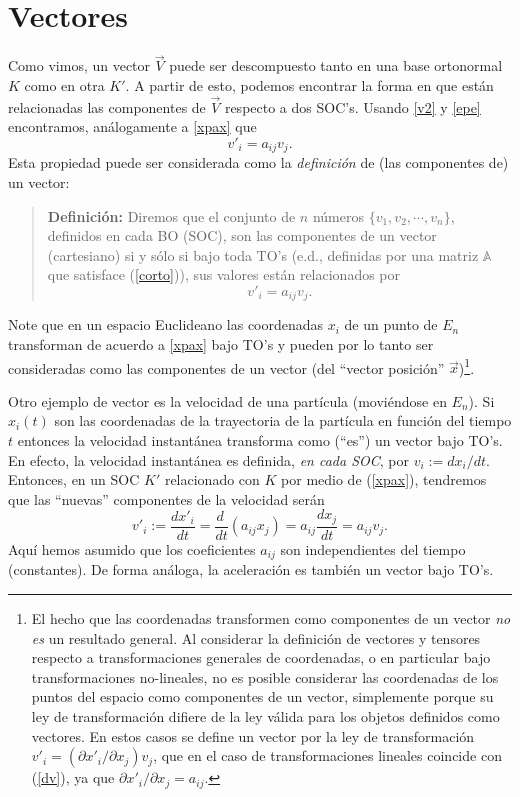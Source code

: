 \section{Vectores}
Como vimos, un vector $\vec{V}$ puede ser descompuesto tanto en una base ortonormal $K$ como en otra $K'$. A partir de esto, podemos encontrar la forma en que están relacionadas las componentes de $\vec{V}$ respecto a dos SOC's. Usando \eqref{v2} y \eqref{epe} encontramos, análogamente a \eqref{xpax} que
\begin{equation}
v'_i=a_{ij}v_j.
\end{equation}
Esta propiedad puede ser considerada como la \textit{definición} de (las componentes de) un vector: 
\begin{quotation}
\textbf{Definición:} Diremos que el conjunto de $n$ números $\lbrace v_1, v_2,\cdots, v_n\rbrace$, definidos en cada BO (SOC), son las componentes de un vector (cartesiano) si y sólo si bajo toda TO's (e.d., definidas por una matriz $\mathbb{A}$ que satisface (\ref{corto})), sus valores están relacionados por 
\begin{equation}\label{dv}
\boxed{v'_i=a_{ij}v_j.}
\end{equation}
\end{quotation}
Note que en un espacio Euclideano las coordenadas $x_i$ de un punto de $E_n$ transforman de acuerdo a \eqref{xpax} bajo TO's y pueden por lo tanto ser consideradas como las componentes de un vector (del ``vector posición'' $\vec{x}$)\footnote{El hecho que las coordenadas transformen como componentes de un vector \textit{no es} un resultado general. Al considerar la definición de vectores y tensores respecto a transformaciones generales de coordenadas, o en particular bajo transformaciones no-lineales, no es posible considerar las coordenadas de los puntos del espacio como componentes de un vector, simplemente porque su ley de transformación difiere de la ley válida para los objetos definidos como vectores. En estos casos se define un vector por la ley de transformación $v'_i=({\partial x'_i}/{\partial x_j})v_j$, que en el caso de transformaciones lineales coincide con (\ref{dv}), ya que ${\partial x'_i}/{\partial x_j}=a_{ij}$.}. 


Otro ejemplo de vector es la velocidad de una partícula (moviéndose en $E_n$). Si $x_i(t)$ son las coordenadas de la trayectoria de la partícula en función del tiempo $t$ entonces la velocidad instantánea transforma como (``es'') un vector bajo TO's. En efecto, la velocidad instantánea es definida, \textit{en cada SOC}, por $v_i:=dx_i/dt$. Entonces, en un SOC $K'$ relacionado con $K$ por medio de (\ref{xpax}), tendremos que las ``nuevas'' componentes de la velocidad serán
\begin{equation}
v'_i:=\frac{dx'_i}{dt}=\frac{d\ }{dt}(a_{ij}x_j)=a_{ij}\frac{dx_j}{dt}=a_{ij}v_j.
\end{equation}
Aquí hemos asumido que los coeficientes $a_{ij}$ son independientes del tiempo (constantes). De forma análoga, la aceleración es también un vector bajo TO's.


